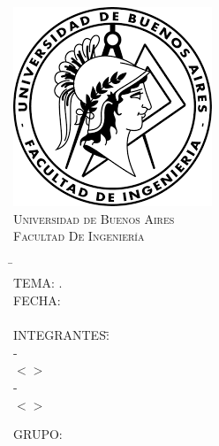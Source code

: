 %
\begin{titlepage}
	
	\thispagestyle{empty}
	
	\begin{center}
		\includegraphics[scale=1]{./Logos/Logo_FIUBA_1}\\
		\large{\textsc{Universidad de Buenos Aires}}\\
		\large{\textsc{Facultad De Ingenierí­a}}\\
		\small{\miCuatri}
	\end{center}
	
	\vfill
	
	\begin{center}
		\Large{\underline{\textsc{\miAsignatura}}}
	\end{center}
	
	\vfill
	
	\begin{tabbing}
		\hspace{2cm}\=\+\miTitulo\\
		TEMA: \miSubtitulo.\\
		FECHA: \miFecha\\
		\\
		INTEGRANTES:\hspace{-1cm}\=\+\hspace{1cm}\=\hspace{6cm}\=\\
		\miAlumnoUno \>\>- \miPadronUno\\
		\>\footnotesize{$<$\miMailAlumnoUno$>$}\\
		\miAlumnoDos	\>\>- \miPadronDos\\
		\>\footnotesize{$<$\miMailAlumnoDos$>$}\\
				
		
	\end{tabbing}
	
	\hspace{1cm} GRUPO: \miNumGrupo
	
	
	
\end{titlepage}
